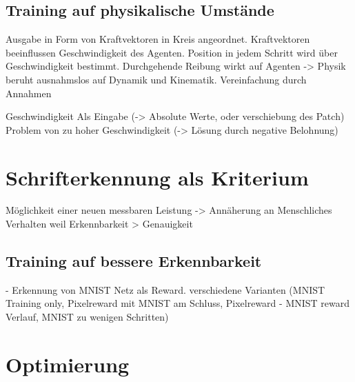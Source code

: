 \subsection*{Training auf physikalische Umstände}
Ausgabe in Form von Kraftvektoren in Kreis angeordnet. Kraftvektoren
beeinflussen Geschwindigkeit des Agenten. Position in jedem Schritt wird über
Geschwindigkeit bestimmt. Durchgehende Reibung wirkt auf Agenten
-> Physik beruht ausnahmslos auf Dynamik und Kinematik. Vereinfachung durch Annahmen

Geschwindigkeit Als Eingabe (-> Absolute Werte, oder verschiebung des Patch)
Problem von zu hoher Geschwindigkeit (-> Lösung durch negative Belohnung)


\section{Schrifterkennung als Kriterium}
Möglichkeit einer neuen messbaren Leistung
-> Annäherung an Menschliches Verhalten weil Erkennbarkeit > Genauigkeit


\subsection*{Training auf bessere Erkennbarkeit}
- Erkennung von MNIST Netz als Reward. 
verschiedene Varianten (MNIST Training only, Pixelreward mit MNIST am Schluss, Pixelreward - MNIST reward Verlauf, MNIST zu wenigen Schritten)


\section{Optimierung}
